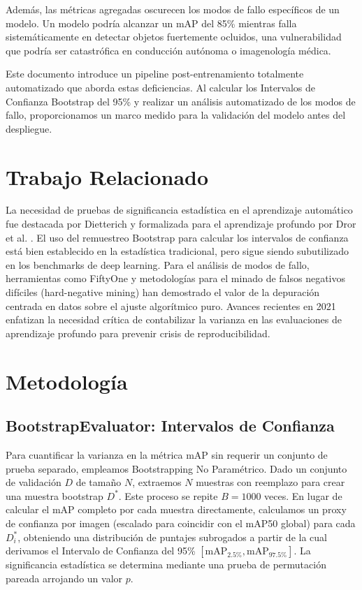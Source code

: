 \documentclass[conference]{IEEEtran}
\begin{document}
Además, las métricas agregadas oscurecen los modos de fallo específicos de un modelo. Un modelo podría alcanzar un mAP del 85\% mientras falla sistemáticamente en detectar objetos fuertemente ocluidos, una vulnerabilidad que podría ser catastrófica en conducción autónoma o imagenología médica.

Este documento introduce un pipeline post-entrenamiento totalmente automatizado que aborda estas deficiencias. Al calcular los Intervalos de Confianza Bootstrap del 95\% y realizar un análisis automatizado de los modos de fallo, proporcionamos un marco medido para la validación del modelo antes del despliegue.

\section{Trabajo Relacionado}
La necesidad de pruebas de significancia estadística en el aprendizaje automático fue destacada por Dietterich \cite{dietterich1998approximate} y formalizada para el aprendizaje profundo por Dror et al. \cite{dror2018hitchhiker}. El uso del remuestreo Bootstrap \cite{efron1994introduction} para calcular los intervalos de confianza está bien establecido en la estadística tradicional, pero sigue siendo subutilizado en los benchmarks de deep learning. Para el análisis de modos de fallo, herramientas como FiftyOne \cite{moore2021fiftyone} y metodologías para el minado de falsos negativos difíciles (hard-negative mining) \cite{shrivastava2016training} han demostrado el valor de la depuración centrada en datos sobre el ajuste algorítmico puro. Avances recientes en 2021 \cite{bouthillier2021accounting} enfatizan la necesidad crítica de contabilizar la varianza en las evaluaciones de aprendizaje profundo para prevenir crisis de reproducibilidad.

\section{Metodología}

\subsection{BootstrapEvaluator: Intervalos de Confianza}
Para cuantificar la varianza en la métrica mAP sin requerir un conjunto de prueba separado, empleamos Bootstrapping No Paramétrico. Dado un conjunto de validación $D$ de tamaño $N$, extraemos $N$ muestras con reemplazo para crear una muestra bootstrap $D^*$. Este proceso se repite $B = 1000$ veces. En lugar de calcular el mAP completo por cada muestra directamente, calculamos un proxy de confianza por imagen (escalado para coincidir con el mAP50 global) para cada $D^*_i$, obteniendo una distribución de puntajes subrogados a partir de la cual derivamos el Intervalo de Confianza del 95\% $[\text{mAP}_{2.5\%}, \text{mAP}_{97.5\%}]$. La significancia estadística se determina mediante una prueba de permutación pareada arrojando un valor $p$.
\end{document}
